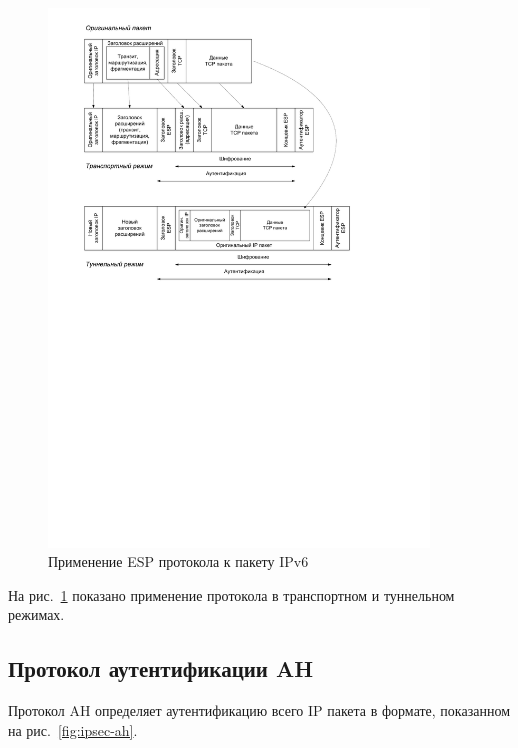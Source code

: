 \begin{figure}[!ht]
	\centering
	\includegraphics[width=0.9\textwidth]{pic/ipsec-esp-modes}
	\caption{Применение ESP протокола к пакету IPv6\label{fig:ipsec-esp-modes}}
\end{figure}

На рис.~\ref{fig:ipsec-esp-modes} показано применение протокола в транспортном и туннельном режимах.


\subsection{Протокол аутентификации AH}

Протокол AH определяет аутентификацию всего IP пакета в формате, показанном на рис.~\ref{fig:ipsec-ah}.

